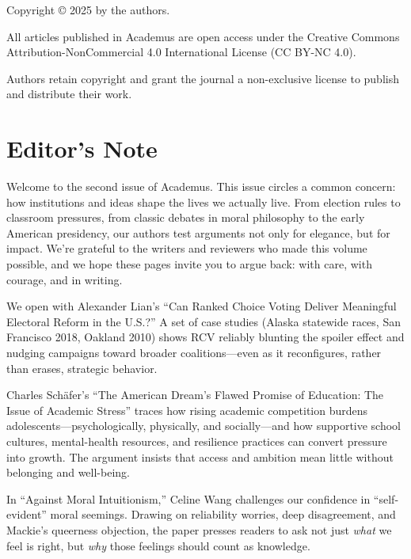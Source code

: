 \documentclass[12pt, letterpaper, openany]{book}
\begin{document}
\frontmatter

\vspace*{\fill}
\begin{center}
Copyright © 2025 by the authors.

All articles published in Academus are open access under the Creative Commons Attribution-NonCommercial 4.0 International License (CC BY-NC 4.0).

Authors retain copyright and grant the journal a non-exclusive license to publish and distribute their work.
\end{center}

\vspace*{\fill}

\chapter{Editor's Note}

Welcome to the second issue of Academus. This issue circles a common concern: how institutions and ideas shape the lives we actually live. From election rules to classroom pressures, from classic debates in moral philosophy to the early American presidency, our authors test arguments not only for elegance, but for impact. We’re grateful to the writers and reviewers who made this volume possible, and we hope these pages invite you to argue back: with care, with courage, and in writing.

We open with Alexander Lian’s “Can Ranked Choice Voting Deliver Meaningful Electoral Reform in the U.S.?” A set of case studies (Alaska statewide races, San Francisco 2018, Oakland 2010) shows RCV reliably blunting the spoiler effect and nudging campaigns toward broader coalitions—even as it reconfigures, rather than erases, strategic behavior.

Charles Schäfer’s “The American Dream’s Flawed Promise of Education: The Issue of Academic Stress” traces how rising academic competition burdens adolescents—psychologically, physically, and socially—and how supportive school cultures, mental-health resources, and resilience practices can convert pressure into growth. The argument insists that access and ambition mean little without belonging and well-being.

In “Against Moral Intuitionism,” Celine Wang challenges our confidence in “self-evident” moral seemings. Drawing on reliability worries, deep disagreement, and Mackie’s queerness objection, the paper presses readers to ask not just \emph{what} we feel is right, but \emph{why} those feelings should count as knowledge.
\end{document}
